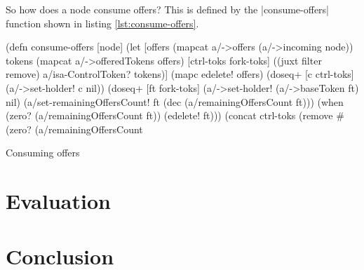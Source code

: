 \documentclass[submission]{eptcs}
\newcommand{\code}{\clojureinline}
\begin{document}
So how does a node consume offers?  This is defined by the
\code|consume-offers| function shown in listing \vref{lst:consume-offers}.

\begin{listing}[h!tb]
\begin{clojurecode}
(defn consume-offers [node]
  (let [offers (mapcat a/->offers (a/->incoming node))
        tokens (mapcat a/->offeredTokens offers)
        [ctrl-toks fork-toks] ((juxt filter remove) a/isa-ControlToken? tokens)]
    (mapc edelete! offers)
    (doseq+ [c ctrl-toks] (a/->set-holder! c nil))
    (doseq+ [ft fork-toks]
      (a/->set-holder! (a/->baseToken ft) nil)
      (a/set-remainingOffersCount! ft (dec (a/remainingOffersCount ft)))
      (when (zero? (a/remainingOffersCount ft))
        (edelete! ft)))
    (concat ctrl-toks (remove #(zero? (a/remainingOffersCount %
\end{clojurecode}
\caption{Consuming offers}
\label{lst:consume-offers}
\end{listing}



\section{Evaluation}
\label{sec:evaluation}



\section{Conclusion}
\label{sec:conclusion}





\end{document}
